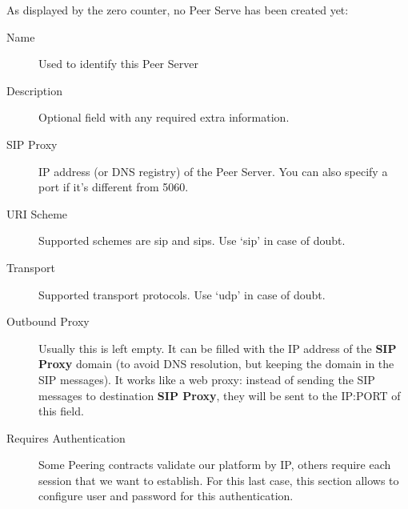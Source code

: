 \documentclass[letterpaper,10pt,english]{sphinxmanual}
\begin{document}

As displayed by the zero counter, no Peer Serve has been created yet:

\begin{description}
\item[{Name}] \leavevmode{}\label{external_incoming_calls/peering_contracts:term-4}
Used to identify this Peer Server

\item[{Description}] \leavevmode{}\label{external_incoming_calls/peering_contracts:term-5}
Optional field with any required extra information.

\item[{SIP Proxy}] \leavevmode{}\label{external_incoming_calls/peering_contracts:term-sip-proxy}
IP address (or DNS registry) of the Peer Server. You can also specify
a port if it's different from 5060.

\item[{URI Scheme}] \leavevmode{}\label{external_incoming_calls/peering_contracts:term-uri-scheme}
Supported schemes are sip and sips. Use `sip' in case of doubt.

\item[{Transport}] \leavevmode{}\label{external_incoming_calls/peering_contracts:term-transport}
Supported transport protocols. Use `udp' in case of doubt.

\item[{Outbound Proxy}] \leavevmode{}\label{external_incoming_calls/peering_contracts:term-outbound-proxy}
Usually this is left empty. It can be filled with the IP address of the
\textbf{SIP Proxy} domain (to avoid DNS resolution, but keeping the domain
in the SIP messages). It works like a web proxy: instead of sending the
SIP messages to destination \textbf{SIP Proxy}, they will be sent to the
IP:PORT of this field.

\item[{Requires Authentication}] \leavevmode{}\label{external_incoming_calls/peering_contracts:term-requires-authentication}
Some Peering contracts validate our platform by IP, others require
each session that we want to establish. For this last case, this section
allows to configure user and password for this authentication.


\end{description}
\end{document}

